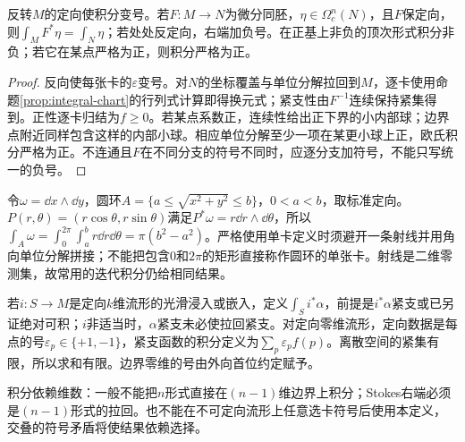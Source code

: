 \begin{proposition}[反向、换元与正性]\label{prop:integral-properties}
反转$M$的定向使积分变号。若$F:M\to N$为微分同胚，$\eta\in\Omega_c^n(N)$，且$F$保定向，则$\int_M F^*\eta=\int_N\eta$；若处处反定向，右端加负号。在正基上非负的顶次形式积分非负；若它在某点严格为正，则积分严格为正。
\end{proposition}
\begin{proof}
反向使每张卡的$\varepsilon$变号。对$N$的坐标覆盖与单位分解拉回到$M$，逐卡使用命题\ref{prop:integral-chart}的行列式计算即得换元式；紧支性由$F^{-1}$连续保持紧集得到。正性逐卡归结为$f\geq0$。若某点系数正，连续性给出正下界的小内部球；边界点附近同样包含这样的内部小球。相应单位分解至少一项在某更小球上正，欧氏积分严格为正。不连通且$F$在不同分支的符号不同时，应逐分支加符号，不能只写统一的负号。
\end{proof}

\begin{example}[二形式的极坐标积分]
令$\omega=\dd x\wedge\dd y$，圆环$A=\{a\leq\sqrt{x^2+y^2}\leq b\}$，$0<a<b$，取标准定向。$P(r,\theta)=(r\cos\theta,r\sin\theta)$满足$P^*\omega=r\dd r\wedge\dd\theta$，所以$\int_A\omega=\int_0^{2\pi}\int_a^b r\dd r\dd\theta=\pi(b^2-a^2)$。严格使用单卡定义时须避开一条射线并用角向单位分解拼接；不能把包含$0$和$2\pi$的矩形直接称作圆环的单张卡。射线是二维零测集，故常用的迭代积分仍给相同结果。
\end{example}

\begin{definition}[沿子流形及零维空间积分]
若$i:S\to M$是定向$k$维流形的光滑浸入或嵌入，定义$\int_S i^*\alpha$，前提是$i^*\alpha$紧支或已另证绝对可积；$i$非适当时，$\alpha$紧支未必使拉回紧支。对定向零维流形，定向数据是每点的号$\varepsilon_p\in\{+1,-1\}$，紧支函数的积分定义为$\sum_p\varepsilon_p f(p)$。离散空间的紧集有限，所以求和有限。边界零维的号由外向首位约定赋予。
\end{definition}
积分依赖维数：一般不能把$n$形式直接在$(n-1)$维边界上积分；Stokes右端必须是$(n-1)$形式的拉回。也不能在不可定向流形上任意选卡符号后使用本定义，交叠的符号矛盾将使结果依赖选择。
